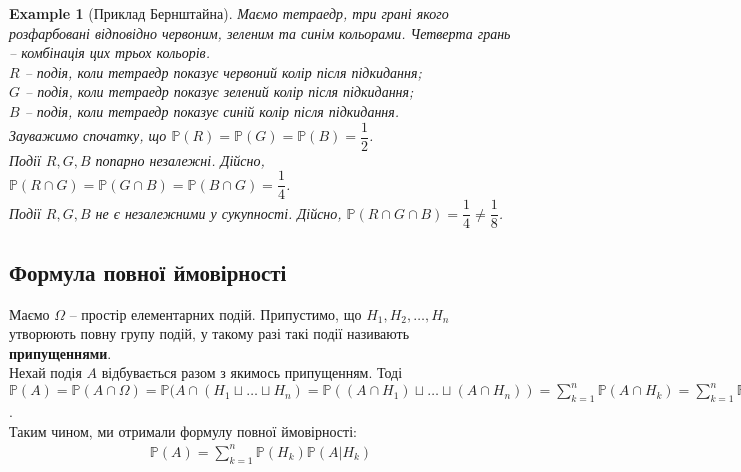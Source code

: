 \documentclass[a4paper, 10pt]{article}
\theoremstyle{theoremdd}
\newtheorem{example}[theorem]{Example}
\begin{document}
\begin{example}[Приклад Бернштайна]
Маємо тетраедр, три грані якого розфарбовані відповідно червоним, зеленим та синім кольорами. Четверта грань -- комбінація цих трьох кольорів.\\
$R$ -- подія, коли тетраедр показує червоний колір після підкидання;\\
$G$ -- подія, коли тетраедр показує зелений колір після підкидання;\\
$B$ -- подія, коли тетраедр показує синій колір після підкидання.\\
Зауважимо спочатку, що $\mathbb{P}(R) = \mathbb{P}(G) = \mathbb{P}(B) = \dfrac{1}{2}$.\\
Події $R,G,B$ попарно незалежні. Дійсно, $\mathbb{P}(R \cap G) = \mathbb{P}(G \cap B) = \mathbb{P}(B \cap G) = \dfrac{1}{4}$.\\
Події $R,G,B$ не є незалежними у сукупності. Дійсно, $\mathbb{P}(R \cap G \cap B) = \dfrac{1}{4} \neq \dfrac{1}{8}$.
\end{example}

\subsection{Формула повної ймовірності}
Маємо $\Omega$ -- простір елементарних подій. Припустимо, що $H_1,H_2,\dots,H_n$ утворюють повну групу подій, у такому разі такі події називають \textbf{припущеннями}.\\
Нехай подія $A$ відбувається разом з якимось припущенням. Тоді\\
$\displaystyle \mathbb{P}(A) = \mathbb{P}\left(A \cap \Omega\right) = \mathbb{P}( A \cap (H_1 \sqcup \dots \sqcup H_n) = \mathbb{P}((A \cap H_1) \sqcup \dots \sqcup (A \cap H_n)) = \sum_{k=1}^n \mathbb{P}(A \cap H_k) = \sum_{k=1}^n \mathbb{P}(H_k) \mathbb{P}(A|H_k)$.\\
Таким чином, ми отримали формулу повної ймовірності:
\begin{align*}
\mathbb{P}(A) = \sum_{k=1}^n \mathbb{P}(H_k) \mathbb{P}(A|H_k)
\end{align*}
\end{document}
